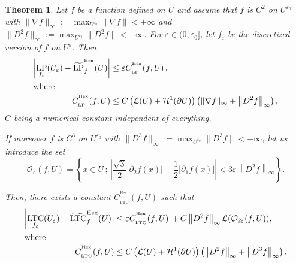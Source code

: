 \documentclass[10pt]{amsart}
\newtheorem{theo}{Theorem}[section]
\theoremstyle{definition}\newtheorem{defi}[theo]{Definition}\newtheorem{rema}[theo]{Remark}\newtheorem{exam}[theo]{Example}\newtheorem{exem}[theo]{Example}\newtheorem{nota}[theo]{Notation}
\newcommand{\eps}{\varepsilon}
\DeclareMathOperator{\LTC}{LTC}
\DeclareMathOperator{\LP}{LP}
\DeclareMathOperator{\Hex}{Hex}
\newcommand{\tLP}{\widetilde{\mathrm{LP}}}
\newcommand{\tLTC}{\widetilde{\mathrm{LTC}}}
\newcommand{\calH}{\mathcal{H}}
\newcommand{\calL}{\mathcal{L}}
\newcommand{\calO}{\mathcal{O}}
\begin{document}
\begin{theo}\label{limit-deter:th}
Let $f$ be a function defined on $U$ and assume that $f$ is $C^2$ on $U^{\eps_0}$ with $\|\nabla f\|_\infty:=\max_{U^{\eps_0}}\|\nabla f\|<+\infty$ and $ \|D^2 f\|_\infty:=\max_{U^{\eps_0}}\|D^2 f\|<+\infty$. For $\eps\in (0,\eps_0]$, let $f_\eps$ be the discretized version of $f$ on $U^{\eps}$. Then,
\begin{align*}
\left| \LP_{f_\eps}(U_\eps) - \tLP^{^{\Hex}}_{f}(U) \right| &\leq
\eps C_{_{\LP}}^{^{\Hex}}(f,U) \,.
\\
\intertext{where}
C_{_{\LP}}^{^{\Hex}}(f,U)&\le C \left({\calL}(U)+{\calH}^1(\partial U)\right)\left(\|\nabla f\|_\infty+\left\|D^2
f\right\|_\infty\right),
\end{align*}
$C$ being a numerical constant independent of everything.

If moreover $f$ is $C^3$ on $U^{\eps_0}$ with $\|D^3 f\|_\infty:=\max_{U^{\eps_0}}\|D^3 f\|<+\infty$, let us introduce the set
\[
{\calO}_{\eps}(f,U) =\left\{ x\in U \, ; \, \left|
\frac{\sqrt{3}}{2}\left|\partial_2f(x)\right|-\frac{1}{2}\left|\partial_1 f(x)\right| \right|<
3 \eps \left\|D^2 f\right\|_\infty \right\}.
\]

Then, there exists a constant $C_{_{\LTC}}^{^{\Hex}}(f,U)$ such that
\begin{align*}
\left|\LTC_{f_\eps}(U_\eps)-\tLTC_{f}^{\Hex}(U)\right| &\le
\eps C_{_{\LTC}}^{^{\Hex}}(f,U)\, + C \left\|D^2 f\right\|_\infty {\calL}({\mathcal
O}_{2\eps}(f,U)),
\\
\intertext{where}
C_{_{\LTC}}^{^{\Hex}}(f,U) &\le C\left({\calL}(U)+{\calH}^1(\partial U)\right)\left(\left\|D^2f\right\|_\infty+\left\|D^3f\right\|_\infty\right).
\end{align*}
\end{theo}
\end{document}
